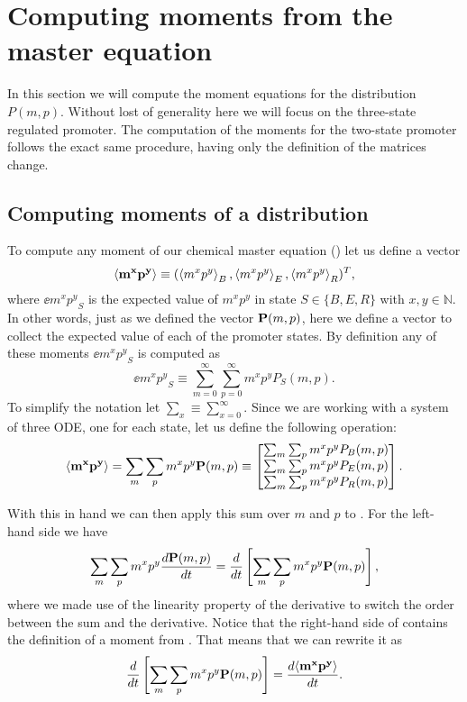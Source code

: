 \section{Computing moments from the master equation}\label{supp_moments}

In this section we will compute the moment equations for the distribution  $P(m,
p)$. Without lost of generality here we will focus on the three-state
regulated promoter. The computation of the moments for the two-state promoter
follows the exact same procedure, having only the definition of the matrices
change.

\subsection{Computing moments of a distribution}

To compute any moment of our chemical master equation ()
let us define a vector
\begin{equation}
  \left\langle \mathbf{m^x p^y} \right\rangle \equiv (\left\langle m^x p^y \right\rangle_B, \left\langle m^x p^y \right\rangle_E, \left\langle m^x p^y \right\rangle_R)^T,
\end{equation}
where $\ee{m^x p^y}_S$ is the expected value of $m^x p^y$ in state $S \in \{B,
E, R\}$ with $x, y \in \mathbb{N}$. In other words, just as we defined the
vector $\mathbf{P}(m, p)$, here we define a vector to collect the expected value of
each of the promoter states. By definition any of these moments $\ee{m^x p^y}_S$
is computed as
\begin{equation}
  \ee{m^x p^y}_S \equiv \sum_{m=0}^\infty \sum_{p=0}^\infty m^x p^y P_S(m, p).
  \label{seq_mom_def}
\end{equation}
To simplify the notation let $\sum_x \equiv \sum_{x=0}^\infty$. Since we are
working with a system of three ODE, one for each state, let us define the
following operation:
\begin{equation}
  \left\langle \mathbf{m^x p^y} \right\rangle =
  \sum_m \sum_p m^x p^y \mathbf{P}(m, p) \equiv
  \begin{bmatrix}
    \sum_m \sum_p m^x p^y P_B(m, p)\\
    \sum_m \sum_p m^x p^y P_E(m, p)\\
    \sum_m \sum_p m^x p^y P_R(m, p)\\
  \end{bmatrix}.
\end{equation}

With this in hand we can then apply this sum over $m$ and $p$ to
. For the left-hand side we have
\begin{equation}
  \sum_m \sum_p m^x p^y {d{\mathbf{P}(m, p)} \over dt} = {d{} \over dt}\left[ \sum_m \sum_p m^x p^y \mathbf{P}(m, p) \right],
  \label{seq_sum_mom}
\end{equation}
where we made use of the linearity property of the derivative to switch the
order between the sum and the derivative. Notice that the right-hand side of
 contains the definition of a moment from .
That means that we can rewrite it as
\begin{equation}
  {d{} \over dt}\left[ \sum_m \sum_p m^x p^y \mathbf{P}(m, p) \right] = {d{\mathbf{\left\langle m^x p^y \right\rangle}} \over dt}.
\end{equation}

